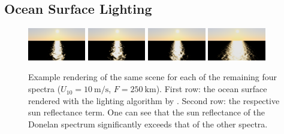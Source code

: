 \subsection{Ocean Surface Lighting}
%
\begin{figure}
\centering
{}
\hfill
{}
\hfill
{}
\hfill
{}
\subtop
{
	\includegraphics[width=0.225\textwidth]{figures/ross_pm.png}
}
\hfill
\subtop
{
	\includegraphics[width=0.225\textwidth]{figures/ross_jonswap.png}
}
\hfill
\subtop
{
	\includegraphics[width=0.225\textwidth]{figures/ross_unified.png}
}
\hfill
\subtop
{
	\includegraphics[width=0.225\textwidth]{figures/ross_donelan.png}
}
\caption[Example rendering of the sun reflectance for each spectrum.]{
Example rendering of the same scene for each of the remaining four spectra
($U_{10}=\SI{10}{\metre\per\second}$, $F=\SI{250}{\km}$).
First row: the ocean surface rendered with the lighting algorithm by
\cite{article:oceanlighting}.
Second row: the respective sun reflectance term.
One can see that the sun reflectance of the Donelan spectrum significantly
exceeds that of the other spectra.
}
\label{fig:sun_reflectance}
\end{figure}
